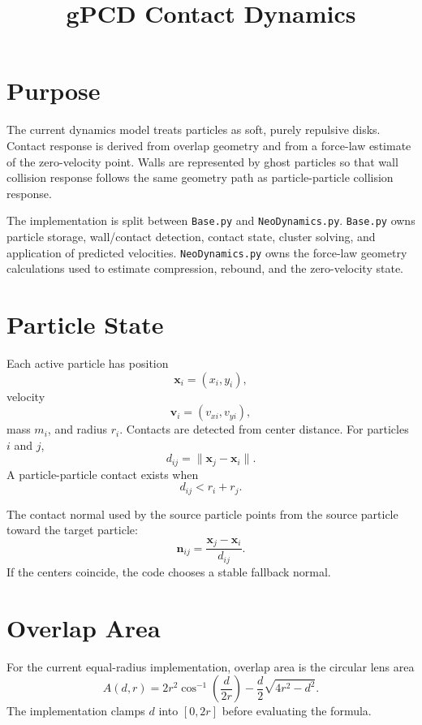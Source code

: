 \documentclass[11pt]{article}
\title{gPCD Contact Dynamics}
\author{}
\date{}
\begin{document}
\maketitle


\section{Purpose}

The current dynamics model treats particles as soft, purely repulsive disks.
Contact response is derived from overlap geometry and from a force-law estimate
of the zero-velocity point. Walls are represented by ghost particles so that
wall collision response follows the same geometry path as particle-particle
collision response.

The implementation is split between \texttt{Base.py} and
\texttt{NeoDynamics.py}. \texttt{Base.py} owns particle storage, wall/contact
detection, contact state, cluster solving, and application of predicted
velocities. \texttt{NeoDynamics.py} owns the force-law geometry calculations
used to estimate compression, rebound, and the zero-velocity state.

\section{Particle State}

Each active particle has position
\[
    \mathbf{x}_i = (x_i, y_i),
\]
velocity
\[
    \mathbf{v}_i = (v_{xi}, v_{yi}),
\]
mass \(m_i\), and radius \(r_i\). Contacts are detected from center distance.
For particles \(i\) and \(j\),
\[
    d_{ij} = \lVert \mathbf{x}_j - \mathbf{x}_i \rVert.
\]
A particle-particle contact exists when
\[
    d_{ij} < r_i + r_j.
\]

The contact normal used by the source particle points from the source particle
toward the target particle:
\[
    \mathbf{n}_{ij}
    =
    \frac{\mathbf{x}_j - \mathbf{x}_i}{d_{ij}}.
\]
If the centers coincide, the code chooses a stable fallback normal.

\section{Overlap Area}

For the current equal-radius implementation, overlap area is the circular lens
area
\[
    A(d, r)
    =
    2r^2 \cos^{-1}\left(\frac{d}{2r}\right)
    -
    \frac{d}{2}\sqrt{4r^2 - d^2}.
\]
The implementation clamps \(d\) into \([0, 2r]\) before evaluating the formula.
\end{document}
